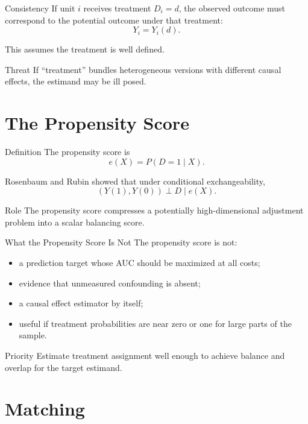 \documentclass[aspectratio=169,11pt]{beamer}
\begin{document}
\begin{frame}{Consistency}
If unit \(i\) receives treatment \(D_i=d\), the observed outcome must correspond to the potential outcome under that treatment:
\[
Y_i=Y_i(d).
\]

This assumes the treatment is well defined.

\begin{block}{Threat}
If “treatment” bundles heterogeneous versions with different causal effects, the estimand may be ill posed.
\end{block}
\end{frame}

\section{The Propensity Score}

\begin{frame}{Definition}
The propensity score is
\[
e(X)=P(D=1\mid X).
\]

Rosenbaum and Rubin showed that under conditional exchangeability,
\[
(Y(1),Y(0))\perp D\mid e(X).
\]

\begin{block}{Role}
The propensity score compresses a potentially high-dimensional adjustment problem into a scalar balancing score.
\end{block}
\end{frame}

\begin{frame}{What the Propensity Score Is Not}
The propensity score is not:
\begin{itemize}
\item a prediction target whose AUC should be maximized at all costs;
\item evidence that unmeasured confounding is absent;
\item a causal effect estimator by itself;
\item useful if treatment probabilities are near zero or one for large parts of the sample.
\end{itemize}

\begin{alertblock}{Priority}
Estimate treatment assignment well enough to achieve balance and overlap for the target estimand.
\end{alertblock}
\end{frame}

\section{Matching}
\end{document}
